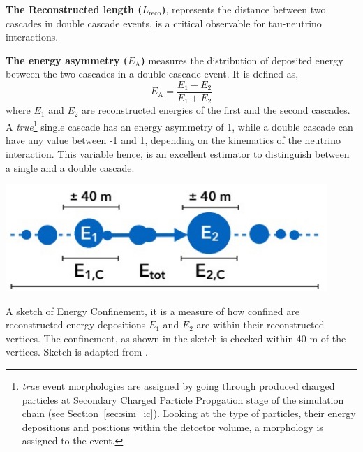 \textbf{The Reconstructed length ($L_{\mathrm{reco}}$)}, represents the distance between two cascades in double cascade events, is a critical observable for tau-neutrino interactions. 

\textbf{The energy asymmetry ($E_{\text{A}}$)} measures the distribution of deposited energy between the two cascades in a double cascade event. It is defined as,
\begin{equation}\label{eq:EA}
    E_{\mathrm{A}} = \frac{E_1-E_2}{E_1+E_2}
\end{equation}
where $E_1$ and $E_2$ are reconstructed energies of the first and the second cascades. A \emph{true}\footnote{\emph{true} event morphologies are assigned by going through produced charged particles at Secondary Charged Particle Propgation stage of the simulation chain (see Section~\ref{sec:sim_ic}). Looking at the type of particles, their energy depositions and positions within the detcetor volume, a morphology is assigned to the event.} single cascade has an energy asymmetry of 1, while a double cascade can have any value between -1 and 1, depending on the kinematics of the neutrino interaction. This variable hence, is an excellent estimator to distinguish between a single and a double cascade.

\begin{marginfigure}
	\includegraphics{./figures/EventSample/EC.pdf}
	\caption{A sketch of Energy Confinement, it is a measure of how confined are reconstructed energy depositions $E_1$ and $E_2$ are within their reconstructed vertices. The confinement, as shown in the sketch is checked within 40 m of the vertices. Sketch is adapted from \cite{marcel_thesis}.}
\end{marginfigure}

